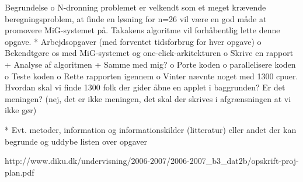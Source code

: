 
Begrundelse
          o N-dronning problemet er velkendt som et meget krævende beregningsproblem, at finde en løsning for n=26 vil være en god måde at promovere MiG-systemet på. Takakens algoritme vil forhåbentlig lette denne opgave. 
    * Arbejdsopgaver (med forventet tidsforbrug for hver opgave)
          o Bekendtgøre os med MiG-systemet og one-click-arkitekturen
          o Skrive en rapport
                + Analyse af algoritmen
                + Samme med mig?
          o Porte koden
          o parallelisere koden
          o Teste koden
          o Rette rapporten igennem
          o Vinter nævnte noget med 1300 cpuer. Hvordan skal vi finde 1300 folk der gider åbne en applet i baggrunden? Er det meningen? (nej, det er ikke meningen, det skal der skrives i afgrænsningen at vi ikke gør)
          

    * Evt. metoder, information og informationskilder (litteratur) eller andet der kan begrunde og uddybe listen over opgaver


http://www.diku.dk/undervisning/2006-2007/2006-2007_b3_dat2b/opskrift-proj-plan.pdf


